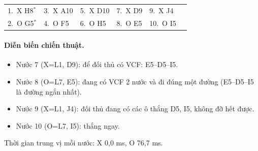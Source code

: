 {\footnotesize\linespread{1}\selectfont
\noindent\begin{tabularx}{\linewidth}{*{6}{X}}
\toprule
1.~X H8$^\ast$ & 3.~X A10 & 5.~X D10 & 7.~X D9 & 9.~X J4 &  \\
2.~O G5$^\ast$ & 4.~O F5 & 6.~O H5 & 8.~O E5 & 10.~O I5 &  \\
\bottomrule
\end{tabularx}\par}
\paragraph{Diễn biến chiến thuật.}
\begin{itemize}\footnotesize\linespread{1.1}\selectfont
\setlength{\itemsep}{0pt}
  \item Nước 7 (X=L1, D9): để đối thủ có VCF: E5--D5--I5.
  \item Nước 8 (O=L7, E5): đang có VCF 2 nước và đi đúng một đường (E5--D5--I5 là đường ngắn nhất).
  \item Nước 9 (X=L1, J4): đối thủ đang có các ô thắng D5, I5, không đỡ hết được.
  \item Nước 10 (O=L7, I5): thắng ngay.
\end{itemize}
Thời gian trung vị mỗi nước: X 0,0 ms, O 76,7 ms.
\clearpage

